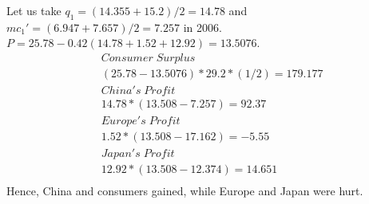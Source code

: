 \documentclass[a4paper]{article}
\begin{document}
\begin{answer}[Shipbuilding (3)]
\begin{itemize}
        Let us take $q_1 = (14.355+15.2)/2 =14.78$ and $mc_1' = (6.947+7.657)/2 = 7.257$ in 2006.
        $P = 25.78 - 0.42(14.78+1.52+12.92)=13.5076$.
        \begin{align*}
            & Consumer \; Surplus \\
            & (25.78-13.5076) * 29.2 * (1/2) = 179.177 \\
            & China's \; Profit \\
            & 14.78 * (13.508-7.257) = 92.37 \\
            & Europe's \; Profit \\
            & 1.52 * (13.508-17.162) = -5.55 \\
            & Japan's \; Profit \\
            & 12.92 * (13.508-12.374) = 14.651 \\
        \end{align*}
        Hence, China and consumers gained, while Europe and Japan were hurt.
    \end{itemize}
    \end{answer}
\end{document}
